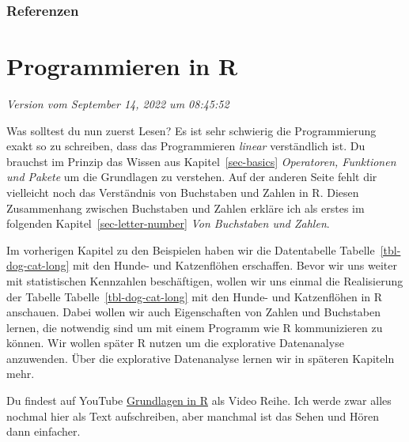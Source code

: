 \documentclass[
  letterpaper,
]{scrbook}
\begin{document}
\hypertarget{referenzen-1}{%
\section*{Referenzen}\label{referenzen-1}}

\part{Programmieren in R}

\emph{Version vom September 14, 2022 um 08:45:52}

Was solltest du nun zuerst Lesen? Es ist sehr schwierig die
Programmierung exakt so zu schreiben, dass das Programmieren
\emph{linear} verständlich ist. Du brauchst im Prinzip das Wissen aus
Kapitel~\ref{sec-basics} \emph{Operatoren, Funktionen und Pakete} um die
Grundlagen zu verstehen. Auf der anderen Seite fehlt dir vielleicht noch
das Verständnis von Buchstaben und Zahlen in R. Diesen Zusammenhang
zwischen Buchstaben und Zahlen erkläre ich als erstes im folgenden
Kapitel~\ref{sec-letter-number} \emph{Von Buchstaben und Zahlen}.

Im vorherigen Kapitel zu den Beispielen haben wir die Datentabelle
Tabelle~\ref{tbl-dog-cat-long} mit den Hunde- und Katzenflöhen
erschaffen. Bevor wir uns weiter mit statistischen Kennzahlen
beschäftigen, wollen wir uns einmal die Realisierung der Tabelle
Tabelle~\ref{tbl-dog-cat-long} mit den Hunde- und Katzenflöhen in R
anschauen. Dabei wollen wir auch Eigenschaften von Zahlen und Buchstaben
lernen, die notwendig sind um mit einem Programm wie R kommunizieren zu
können. Wir wollen später R nutzen um die explorative Datenanalyse
anzuwenden. Über die explorative Datenanalyse lernen wir in späteren
Kapiteln mehr.

\begin{tcolorbox}[enhanced jigsaw, coltitle=black, titlerule=0mm, bottomrule=.15mm, opacityback=0, opacitybacktitle=0.6, leftrule=.75mm, title=\textcolor{quarto-callout-tip-color}{\faLightbulb}\hspace{0.5em}{Einführung in R per Video}, toprule=.15mm, bottomtitle=1mm, toptitle=1mm, left=2mm, breakable, arc=.35mm, colback=white, rightrule=.15mm, colbacktitle=quarto-callout-tip-color!10!white, colframe=quarto-callout-tip-color-frame]
Du findest auf YouTube
\href{https://www.youtube.com/playlist?list=PLe51bCp9JvEFUnFqaJG5aRmON9i1ZbOYC}{Grundlagen
in R} als Video Reihe. Ich werde zwar alles nochmal hier als Text
aufschreiben, aber manchmal ist das Sehen und Hören dann einfacher.
\end{tcolorbox}
\end{document}
